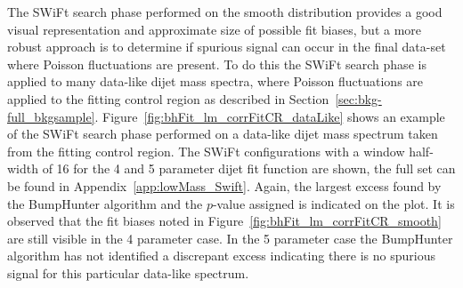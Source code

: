 The SWiFt search phase performed on the smooth distribution provides a good visual representation and approximate size of possible fit biases,
but a more robust approach is to determine if spurious signal can occur in the final data-set where Poisson fluctuations are present.
To do this the SWiFt search phase is applied to many data-like dijet mass spectra,
where Poisson fluctuations are applied to the fitting control region as described in Section~\ref{sec:bkg-full_bkgsample}.
Figure~\ref{fig:bhFit_lm_corrFitCR_dataLike} shows an example of the SWiFt search phase performed on a data-like dijet mass spectrum taken from the fitting control region.
The SWiFt configurations with a window half-width of 16 for the 4 and 5 parameter dijet fit function are shown, the full set can be found in Appendix~\ref{app:lowMass_Swift}.
Again, the largest excess found by the {\sc BumpHunter} algorithm and the \mbox{$p$-value} assigned is indicated on the plot.
It is observed that the fit biases noted in Figure~\ref{fig:bhFit_lm_corrFitCR_smooth} are still visible in the 4 parameter case.
In the 5 parameter case the {\sc BumpHunter} algorithm has not identified a discrepant excess indicating
there is no spurious signal for this particular data-like spectrum.

